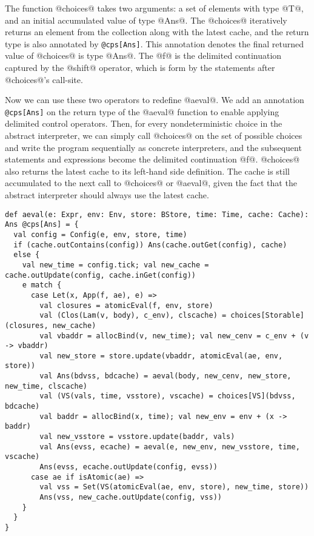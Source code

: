 \documentclass[acmsmall]{acmart}\settopmatter{}
\begin{document}
The function @choices@ takes two arguments: a set of elements with type @T@, 
and an initial accumulated value of type @Ans@.
The @choices@ iteratively returns an element from the collection along with the 
latest cache, and the return type is also annotated by \verb|@cps[Ans]|. 
This annotation denotes the final returned value of @choices@ is type @Ans@.
The @f@ is the delimited continuation captured by the @shift@ operator, which
is form by the statements after @choices@'s call-site.

Now we can use these two operators to redefine @aeval@.
We add an annotation \verb|@cps[Ans]| on the return type of the @aeval@ function to enable
applying delimited control operators.
Then, for every nondeterministic choice in the abstract interpreter, we can simply call 
@choices@ on the set of possible choices and write the program sequentially as concrete 
interpreters, and the subsequent statements and expressions become the delimited continuation
@f@. @choices@ also returns the latest cache to its left-hand side definition.
The cache is still accumulated to the next call to @choices@ or @aeval@, 
given the fact that the abstract interpreter should always use the latest cache.

\begin{lstlisting}
def aeval(e: Expr, env: Env, store: BStore, time: Time, cache: Cache): Ans @cps[Ans] = {
  val config = Config(e, env, store, time)
  if (cache.outContains(config)) Ans(cache.outGet(config), cache)
  else {
    val new_time = config.tick; val new_cache = cache.outUpdate(config, cache.inGet(config))
    e match {
      case Let(x, App(f, ae), e) =>
        val closures = atomicEval(f, env, store)
        val (Clos(Lam(v, body), c_env), clscache) = choices[Storable](closures, new_cache)
        val vbaddr = allocBind(v, new_time); val new_cenv = c_env + (v -> vbaddr)
        val new_store = store.update(vbaddr, atomicEval(ae, env, store))
        val Ans(bdvss, bdcache) = aeval(body, new_cenv, new_store, new_time, clscache)
        val (VS(vals, time, vsstore), vscache) = choices[VS](bdvss, bdcache)
        val baddr = allocBind(x, time); val new_env = env + (x -> baddr)
        val new_vsstore = vsstore.update(baddr, vals)
        val Ans(evss, ecache) = aeval(e, new_env, new_vsstore, time, vscache)
        Ans(evss, ecache.outUpdate(config, evss))
      case ae if isAtomic(ae) =>
        val vss = Set(VS(atomicEval(ae, env, store), new_time, store))
        Ans(vss, new_cache.outUpdate(config, vss))
    }
  }
}
\end{lstlisting}
\end{document}
